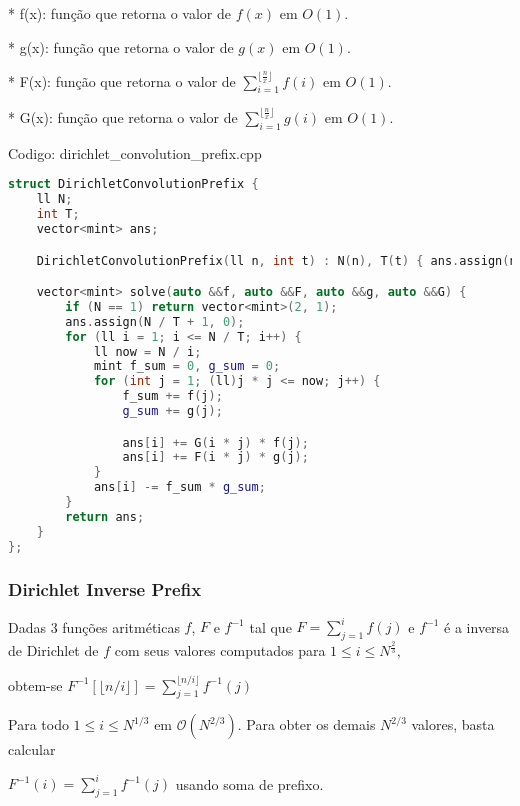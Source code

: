 \documentclass[10pt, a4paper, oneside]{book}
\begin{document}
\textbf{} 


* f(x): função que retorna o valor de $f(x)$ em $O(1)$. 

* g(x): função que retorna o valor de $g(x)$ em $O(1)$.

* F(x): função que retorna o valor de $\sum_{i=1}^{\lfloor \frac{n}{x} \rfloor} f(i)$ em $O(1)$. 

* G(x): função que retorna o valor de $\sum_{i=1}^{\lfloor \frac{n}{x} \rfloor} g(i)$ em $O(1)$.

\hfill

Codigo: dirichlet\_convolution\_prefix.cpp

\begin{lstlisting}[language=C++]
struct DirichletConvolutionPrefix {
    ll N;
    int T;
    vector<mint> ans;

    DirichletConvolutionPrefix(ll n, int t) : N(n), T(t) { ans.assign(n / T + 1, 0); }

    vector<mint> solve(auto &&f, auto &&F, auto &&g, auto &&G) {
        if (N == 1) return vector<mint>(2, 1);
        ans.assign(N / T + 1, 0);
        for (ll i = 1; i <= N / T; i++) {
            ll now = N / i;
            mint f_sum = 0, g_sum = 0;
            for (int j = 1; (ll)j * j <= now; j++) {
                f_sum += f(j);
                g_sum += g(j);

                ans[i] += G(i * j) * f(j);
                ans[i] += F(i * j) * g(j);
            }
            ans[i] -= f_sum * g_sum;
        }
        return ans;
    }
};
\end{lstlisting}
\hfill

\subsubsection{Dirichlet Inverse Prefix}


Dadas 3 funções aritméticas $f$, $F$ e $f^{-1}$ tal que $F = \sum_{j=1}^{i} f(j)$ e $f^{-1}$ é a inversa de Dirichlet de $f$ com seus valores computados para $1 \le i \le N ^ {\frac{2}{3}}$,

obtem-se $F^{-1}[\lfloor n / i \rfloor] = \sum_{j=1}^{\lfloor n / i \rfloor} f^{-1}(j)$ 



Para todo $1 \le i \le N^{1/3}$ em $\mathcal{O}(N^{2/3})$. Para obter os demais $N^{2/3}$ valores, basta calcular

$F^{-1}(i) = \sum_{j=1}^{i} f^{-1}(j)$ usando soma de prefixo.
\end{document}

